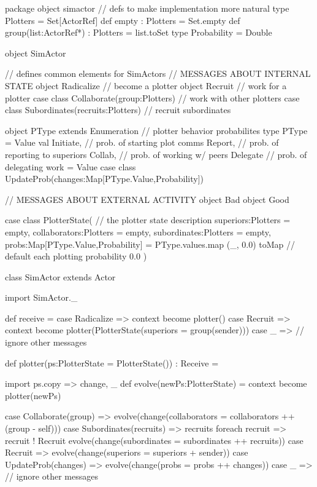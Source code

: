 \documentclass{article}
\begin{document}
\begin{code}
package object simactor { // defs to make implementation more natural
  type Plotters = Set[ActorRef]
  def empty : Plotters = Set.empty
  def group(list:ActorRef*) : Plotters = list.toSet
  type Probability = Double
}

object SimActor { // defines common elements for SimActors
  // MESSAGES ABOUT INTERNAL STATE
  object Radicalize                           // become a plotter
  object Recruit                              // work for a plotter
  case class Collaborate(group:Plotters)      // work with other plotters
  case class Subordinates(recruits:Plotters)  // recruit subordinates
  
  object PType extends Enumeration { // plotter behavior probabilites
    type PType = Value
    val Initiate, // prob. of starting plot comms
        Report,   // prob. of reporting to superiors
    	  Collab,	  // prob. of working w/ peers
    	  Delegate  // prob. of delegating work
    		  = Value
  }
  case class UpdateProb(changes:Map[PType.Value,Probability])

  // MESSAGES ABOUT EXTERNAL ACTIVITY
  object Bad
  object Good

  case class PlotterState( // the plotter state description
    superiors:Plotters = empty,
    collaborators:Plotters = empty,
    subordinates:Plotters = empty,
    probs:Map[PType.Value,Probability] = PType.values.map { (_, 0.0) } toMap
    // default each plotting probability 0.0
  )
}

class SimActor extends Actor {
  import SimActor._
  
  def receive = {
    case Radicalize =>
      context become plotter()
    case Recruit =>
      context become plotter(PlotterState(superiors = group(sender)))
    case _ => // ignore other messages
  }
  
  def plotter(ps:PlotterState = PlotterState()) : Receive = {
    import ps.{copy => change, _}
    def evolve(newPs:PlotterState) = context become plotter(newPs)
    
    {
       case Collaborate(group) =>
         evolve(change(collaborators = collaborators ++ (group - self)))
       case Subordinates(recruits) =>
         recruits foreach { recruit => recruit ! Recruit }
         evolve(change(subordinates = subordinates ++ recruits))
       case Recruit =>
         evolve(change(superiors = superiors + sender))
       case UpdateProb(changes) =>
         evolve(change(probs = probs ++ changes))
       case _ => // ignore other messages
    }
  }
}
\end{code}
\end{document}
